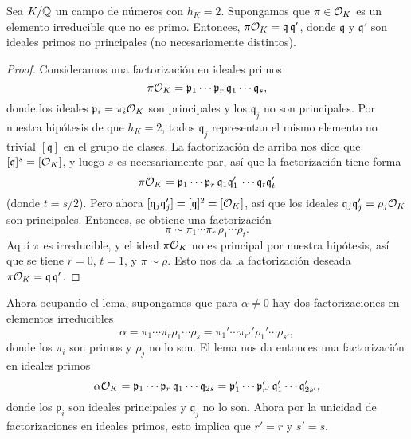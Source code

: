 \begin{lema}
  Sea $K/\mathbb{Q}$ un campo de números con $h_K = 2$. Supongamos que $\pi \in \mathcal{O}_K$
  es un elemento irreducible que no es primo. Entonces,
  $\pi\mathcal{O}_K = \mathfrak{q}\,\mathfrak{q}'$, donde
  $\mathfrak{q}$ y $\mathfrak{q}'$ son ideales primos no principales
  (no necesariamente distintos).

  \begin{proof}
    Consideramos una factorización en ideales primos
    $$\pi\mathcal{O}_K = \mathfrak{p}_1 \cdots \mathfrak{p}_r\,\mathfrak{q}_1 \cdots \mathfrak{q}_s,$$
    donde los ideales $\mathfrak{p}_i = \pi_i \mathcal{O}_K$ son principales y los
    $\mathfrak{q}_j$ no son principales. Por nuestra hipótesis de que $h_K = 2$,
    todos $\mathfrak{q}_j$ representan el mismo elemento no trivial
    $[\mathfrak{q}]$ en el grupo de clases. La factorización de arriba nos dice
    que $[\mathfrak{q}]^s = [\mathcal{O}_K]$, y luego $s$ es necesariamente par, así
    que la factorización tiene forma
    $$\pi\mathcal{O}_K = \mathfrak{p}_1 \cdots \mathfrak{p}_r\,\mathfrak{q}_1 \mathfrak{q}_1'\, \cdots \mathfrak{q}_t \mathfrak{q}_t'$$
    (donde $t = s/2$). Pero ahora
    $[\mathfrak{q}_j \mathfrak{q}_j'] = [\mathfrak{q}]^2 = [\mathcal{O}_K]$,
    así que los ideales $\mathfrak{q}_j \mathfrak{q}_j' = \rho_j \mathcal{O}_K$ son
    principales. Entonces, se obtiene una factorización
    $$\pi \sim \pi_1 \cdots \pi_r\,\rho_1 \cdots \rho_t.$$
    Aquí $\pi$ es irreducible, y el ideal $\pi \mathcal{O}_K$ no es principal por nuestra
    hipótesis, así que se tiene $r = 0$, $t = 1$, y $\pi \sim \rho$. Esto nos da
    la factorización deseada $\pi \mathcal{O}_K = \mathfrak{q}\,\mathfrak{q}'$.
  \end{proof}
\end{lema}

Ahora ocupando el lema, supongamos que para $\alpha \ne 0$ hay dos
factorizaciones en elementos irreducibles
$$\alpha = \pi_1 \cdots \pi_r \rho_1 \cdots \rho_s = \pi_1' \cdots \pi_{r'}' \rho_1' \cdots \rho_{s'},$$
donde los $\pi_i$ son primos y $\rho_j$ no lo son. El lema nos da entonces una
factorización en ideales primos
$$\alpha \mathcal{O}_K = \mathfrak{p}_1 \cdots \mathfrak{p}_r\,\mathfrak{q}_1 \cdots \mathfrak{q}_{2s} = \mathfrak{p}_1' \cdots \mathfrak{p}_{r'}'\,\mathfrak{q}_1' \cdots \mathfrak{q}_{2s'}',$$
donde los $\mathfrak{p}_i$ son ideales principales y $\mathfrak{q}_j$ no lo son.
Ahora por la unicidad de factorizaciones en ideales primos, esto implica que
$r' = r$ y $s' = s$.

\vspace{1em}

